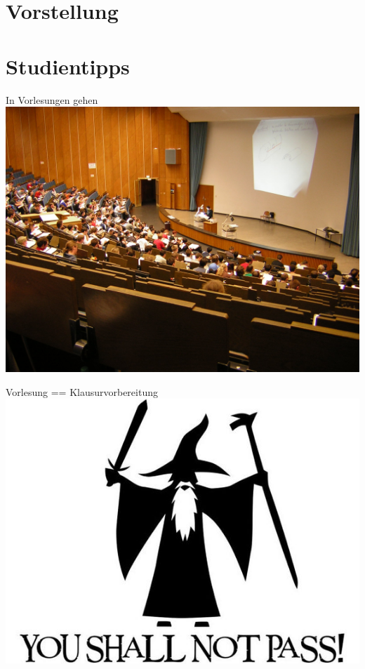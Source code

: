 \documentclass{beamer}
\begin{document}
\section{Vorstellung}
\frame{\sectionpage}
{



}

\section{Studientipps}
\begin{frame}{In Vorlesungen gehen}
\includegraphics[width=\textwidth]{img/lecture.jpg}
\end{frame}

\begin{frame}{Vorlesung == Klausurvorbereitung}
\includegraphics[width=\textwidth]{img/nopass.jpg}
\end{frame}
\end{document}
